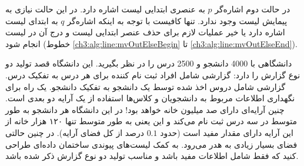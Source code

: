 {در حالت دوم اشاره‌گر {$p$} به عنصری ابتدایی لیست {} اشاره دارد. در این حالت نیازی به پیمایش لیست {} وجود ندارد. تنها کافیست با توجه به اینکه اشاره‌گر {$q$} به ابتدای لیست {} اشاره دارد یا خیر عملیات لازم برای حذف عنصر ابتدایی لیست {} و درج آن در لیست {} انجام شود (خطوط {\ref{ch3:alg:line:mvOutElseBegin}} تا {\ref{ch3:alg:line:mvOutElseEnd}}).

 دانشگاهی با 4000 دانشجو و 2500 درس را در نظر بگیرید. این دانشگاه قصد تولید دو نوع گزارش را دارد:
 گزارشی شامل افراد ثبت نام کننده برای هر درس به تفکیک درس.
 گزارشی شامل دروس اخذ شده توسط یک دانشجو به تفکیک دانشجو.
یک راه برای نگهداری اطلاعات مربوط به دانشجویان و کلاس‌ها استفاده از یک آرایه دو بعدی است. چنین آرایه‌ای دارای صد میلیون خانه خواهد بود! در این دانشگاه هر دانشجو به طور متوسط در سه درس ثبت نام می‌کند و این یعنی به طور متوسط تنها ۱۲۰ هزار خانه از این آرایه دارای مقدار مفید است (حدود {$0.1$} درصد از کل فضای آرایه). در چنین حالتی فضای بسیار زیادی به هدر می‌رود. به کمک لیست‌های پیوندی ساختمان داده‌ای طراحی کنید که فقط شامل اطلاعات مفید باشد و مناسب تولید دو نوع گزارش ذکر شده باشد.


}

